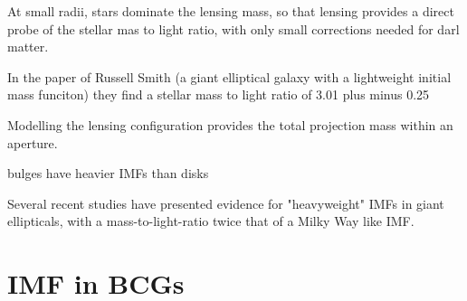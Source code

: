 At small radii, stars dominate the lensing mass, so that lensing provides a direct probe of the stellar mas to light ratio, with only small corrections needed for darl matter.

In the paper of Russell Smith (a giant elliptical galaxy with a lightweight initial mass funciton) they find a stellar mass to light ratio of 3.01 plus minus 0.25

Modelling the lensing configuration provides the total projection mass within an aperture.

bulges have heavier IMFs than disks

Several recent studies have presented evidence for "heavyweight" IMFs in giant ellipticals, with a mass-to-light-ratio twice that of a Milky Way like IMF.



\section{IMF in BCGs}



